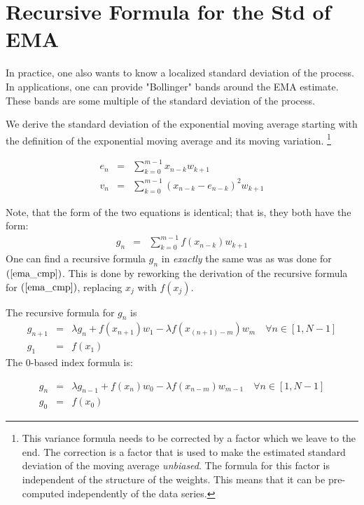 \documentclass{article}
\begin{document}
\section{Recursive Formula for the Std of EMA}
In practice, one also wants to know a localized standard deviation of the process.
In applications, one can provide "Bollinger" bands around the EMA estimate.
These bands are some multiple of the standard deviation of the process.

We derive the standard deviation of the exponential moving average starting
with the definition of the exponential moving average and its moving variation.%
\footnote{This variance formula needs to be corrected by a factor which we 
leave to the end. The correction is a factor that is used to make the 
estimated standard deviation of the moving average {\em unbiased\/}.
The formula for this factor is independent of the structure of the weights.
This means that it can be pre-computed independently of the data series.}

\begin{eqnarray}
    e_n & = & \sum_{k=0}^{m-1} x_{n-k} w_{k+1} \label{ema_cmp} \\
    v_n & = & \sum_{k=0}^{m-1} (x_{n-k} - e_{n-k})^2 w_{k+1}  \label{var} 
\end{eqnarray}

Note, that the form of the two equations is identical; that is, 
they both have the form:
\begin{eqnarray}
    g_n & = & \sum_{k=0}^{m-1} f(x_{n-k}) w_{k+1}
\end{eqnarray}
One can find a recursive formula $g_n$ in {\em exactly\/} the same was as
was done for $(\ref{ema_cmp})$. This is done by reworking the derivation of 
the recursive formula for $(\ref{ema_cmp})$, replacing $x_j$ with $f(x_j)$.

The recursive formula for $g_n$ is
\begin{eqnarray}
    g_{n+1} & = & \lambda g_{n} + f(x_{n+1}) w_1 - \lambda f(x_{(n+1)-m}) w_m \quad \forall n \in [1, N-1] \\
    g_1 & = & f(x_1)
\end{eqnarray}
The 0-based index formula is:

\begin{eqnarray}
    g_{n} & = & \lambda g_{n-1} + f(x_{n}) w_0 - \lambda f(x_{n-m}) w_{m-1} \quad \forall n \in [1, N-1] \\
    g_0 & = & f(x_0)
\end{eqnarray}
\end{document}

